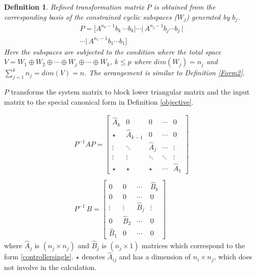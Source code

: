 \documentclass{elsarticle}
\newtheorem{Definition}{Definition}
\numberwithin{equation}{section}
\begin{document}
\begin{Definition}

Refined transformation matrix $P$ is obtained from the corresponding basis of the constrained cyclic subspaces ($W_j$) generated by $b_j$.
\begin{equation}\label{eq:m3}
	\begin{aligned}
	P=[ A^{n_{k}-1}b_k\,\cdots b_k | \cdots | \,A^{n_{j}-1}b_j \cdots b_j\,| \\			\cdots|\, A^{n_{1}-1}b_1 \cdots b_1]
	\end{aligned}
\end{equation}
Here the subspaces are subjected to the condition where the total space $V = W_1 \oplus W_2 \oplus \cdots \oplus W_j \oplus \cdots \oplus W_k$, $k\leq p$ where $dim(W_j) = n_j$ and $\sum_{j=1}^{k}n_{j} = dim(V) = n$. The arrangement is similar to \textit{Definition} \ref{Form2}.

\end{Definition}

$P$ transforms the system matrix to block lower triangular matrix and the input matrix to the special canonical form in Definition \ref{objective}.

\begin{equation}\label{eq:m6}
	\begin{split}
	{
	P^{-1}AP = \begin{bmatrix} \widehat{A}_{k} & 0 & 0 &\cdots & 0\\ 
	\star & \widehat{A}_{k-1} & 0 & \cdots &  0 \\
	\vdots & \ddots & \widehat{A}_j & \cdots & \vdots \\
	\vdots & \vdots & \ddots & \ddots & \vdots \\
	\star & \star & \star & \cdots &  \widehat{A}_{1}
	\end{bmatrix}
	}
	\hspace{0cm} \\ \\
	{
	P^{-1}\,B= \begin{bmatrix}
   	0 & 0 &\cdots & \widehat{B}_k\\
	0 & 0 & \cdots & 0\\
	\vdots &\vdots & \widehat{B}_j & \vdots\\
	0 & \widehat{B}_2 &\cdots & 0\\
	\widehat{B}_1 & 0 &\cdots & 0
	\end{bmatrix}
	}
	\end{split}
\end{equation}
where $\widehat{A}_j$ is $(n_j \times n_j)$ and $\widehat{B}_j$ is $(n_j \times 1)$  matrices which correspond to the form \eqref{controllersingle}. $\star$ denotes $\widehat{A}_{ij}$ and has a dimension of $n_i \times n_j$, which does not involve in the calculation. \\
\end{document}
